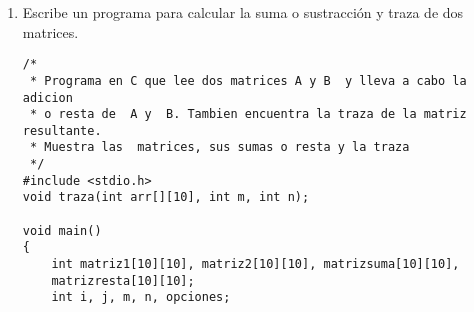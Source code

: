 \documentclass[twoside,10.5pt]{article}%
\begin{document}
\begin{enumerate}
\begin{verbatim}
#include <stdio.h>
#include <stdlib.h>
int main(void) {
    char var[] = { 'x', 'y', 'z', 'w' };
    printf(" Ingresamos el numero de variables en las ecuaciones: ");
    int n;
    scanf("%d", &n);
    printf("\n Ingresamos los coeficientes de cada variable para cada ecuacion");
    printf("\nax + by + cz + ... = d\n");
    int mat[n][n];
    int constantes[n][1];    
    int i,j;
    for (i = 0; i < n; i++) {
        for (j = 0; j < n; j++) {
            scanf("%i", &mat[i][j]);
        }
        scanf("%i", &constantes[i][0]);
    }
    
    printf("La matriz representacion es:\n");
    for (i = 0; i < n; i++) {
        for (j = 0; j < n; j++) {
            printf(" %i", mat[i][j]);
        }
        printf(" %c", var[i]);
        printf(" = %i", constantes[i][0]);
        printf("\n");
    }
    return 0;
}
\end{verbatim}

\item Escribe un programa para calcular la suma o sustracci\'on y traza de dos matrices.

\begin{verbatim}
/*
 * Programa en C que lee dos matrices A y B  y lleva a cabo la adicion 
 * o resta de  A y  B. Tambien encuentra la traza de la matriz resultante.
 * Muestra las  matrices, sus sumas o resta y la traza
 */
#include <stdio.h>
void traza(int arr[][10], int m, int n);
 
void main()
{
    int matriz1[10][10], matriz2[10][10], matrizsuma[10][10],
    matrizresta[10][10];
    int i, j, m, n, opciones;
 

\end{verbatim}
\end{enumerate}
\end{document}
